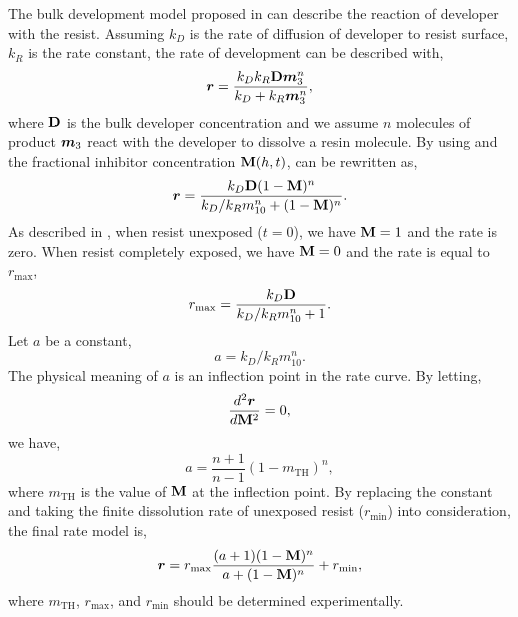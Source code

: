  The bulk development model proposed in \cite{mack1987development} can describe the reaction of developer with the resist. Assuming $k_D$ is the rate of diffusion of developer to resist surface, $k_R$ is the rate constant, the rate of development can be described with,
\begin{equation}
    {\bm{r}} = \frac{k_Dk_R{\mathbf{D}}{\bm{m}}_3^n}{k_D+k_R{\bm{m}}_3^n}, \label{eq:speed}
\end{equation}
where ${\mathbf{D}}$ is the bulk developer concentration and we assume $n$ molecules of product ${\bm{m}}_3$ react with the developer to dissolve a resin molecule. By using  and the fractional inhibitor concentration ${\mathbf{M}}(h,t)$,  can be rewritten as,
\begin{equation}
     {\bm{r}} = \frac{k_D{\mathbf{D}}(1-{\mathbf{M}})^n}{k_D/k_Rm_{10}^n+(1-{\mathbf{M}})^n}. 
\end{equation}
As described in , when resist unexposed ($t=0$), we have ${\mathbf{M}}=1$ and the rate is zero. When resist completely exposed, we have ${\mathbf{M}} = 0$ and the rate is equal to $r_\text{max}$,
\begin{equation}
    r_\text{max} = \frac{k_D{\mathbf{D}}}{k_D/k_Rm_{10}^n+1}.
\end{equation}
Let $a$ be a constant,
\begin{equation}
    a = k_D/k_Rm_{10}^n.
\end{equation}
The physical meaning of $a$ is an inflection point in the rate curve. By letting,
\begin{equation}
    \frac{d^2{\bm{r}}}{d{\mathbf{M}}^2} = 0,
\end{equation}
we have,
\begin{equation}
    a = \frac{n+1}{n-1}(1-m_\text{TH})^n,
\end{equation}
where $m_\text{TH}$ is the value of ${\mathbf{M}}$ at the inflection point. By replacing the constant and taking the finite dissolution rate of unexposed resist ($r_\text{min}$) into consideration, the final rate model is,
\begin{equation}
    {\bm{r}} = r_\text{max}\frac{(a +1)(1-{\mathbf{M}})^n}{a+(1-{\mathbf{M}})^n} + r_\text{min},
\end{equation}
where $m_\text{TH}$, $r_\text{max}$, and $r_\text{min}$ should be determined experimentally.

